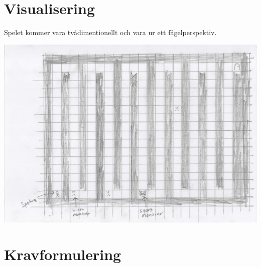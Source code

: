 \documentclass{TDP005mall}
\begin{document}
\newpage
\section{Visualisering}
Spelet kommer vara tvådimentionellt och vara ur ett fågelperspektiv. 

\includegraphics[scale=0.5]{Spelskiss}

\newpage
\section{Kravformulering}
\end{document}
